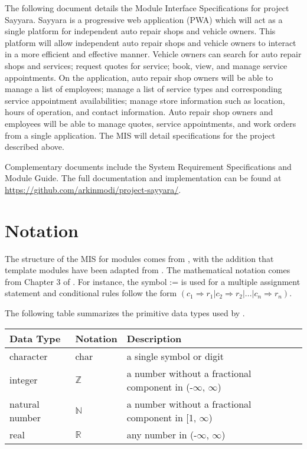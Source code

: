 \documentclass[12pt, titlepage]{article}
\begin{document}
The following document details the Module Interface Specifications for project Sayyara. Sayyara is
a progressive web application (PWA) which will act as a single platform for independent auto repair
shops and vehicle owners. This platform will allow independent auto repair shops and vehicle owners
to interact in a more efficient and effective manner. Vehicle owners can search for auto repair
shops and services; request quotes for service; book, view, and manage service appointments. On the
application, auto repair shop owners will be able to manage a list of employees; manage a list of
service types and corresponding service appointment availabilities; manage store information such
as location, hours of operation, and contact information. Auto repair shop owners and employees
will be able to manage quotes, service appointments, and work orders from a single application. The
MIS will detail specifications for the project described above.

Complementary documents include the System Requirement Specifications and Module Guide. The full
documentation and implementation can be found at
\url{https://github.com/arkinmodi/project-sayyara/}.

\section{Notation}


The structure of the MIS for modules comes from \citet{HoffmanAndStrooper1995}, with the addition
that template modules have been adapted from \cite{GhezziEtAl2003}. The mathematical notation comes
from Chapter 3 of \citet{HoffmanAndStrooper1995}. For instance, the symbol := is used for a
multiple assignment statement and conditional rules follow the form $(c_1 \Rightarrow r_1 | c_2
	\Rightarrow r_2 | ... | c_n \Rightarrow r_n )$.

The following table summarizes the primitive data types used by \progname.

\begin{center}
	\renewcommand{\arraystretch}{1.2}
	\noindent
	\begin{tabular}{l l p{7.5cm}}
		\toprule
		\textbf{Data Type} & \textbf{Notation} & \textbf{Description}                                             \\
		\midrule
		character          & char              & a single symbol or digit                                         \\
		integer            & $\mathbb{Z}$      & a number without a fractional component in (-$\infty$, $\infty$) \\
		natural number     & $\mathbb{N}$      & a number without a fractional component in [1, $\infty$)         \\
		real               & $\mathbb{R}$      & any number in (-$\infty$, $\infty$)                              \\
		\bottomrule
	\end{tabular}
\end{center}
\end{document}

